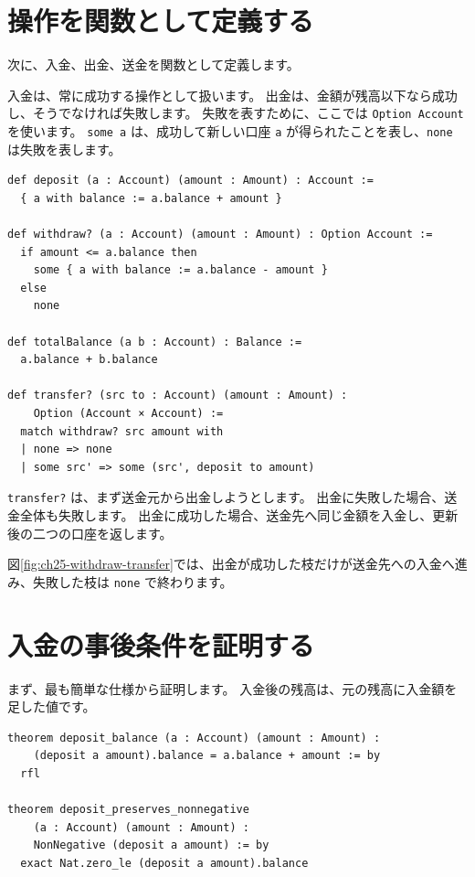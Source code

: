 \section{操作を関数として定義する}

次に、入金、出金、送金を関数として定義します。

入金は、常に成功する操作として扱います。
出金は、金額が残高以下なら成功し、そうでなければ失敗します。
失敗を表すために、ここでは \texttt{Option Account} を使います。
\texttt{some a} は、成功して新しい口座 \texttt{a} が得られたことを表し、\texttt{none} は失敗を表します。

\begin{listing}[htbp]
\begin{verbatim}
def deposit (a : Account) (amount : Amount) : Account :=
  { a with balance := a.balance + amount }

def withdraw? (a : Account) (amount : Amount) : Option Account :=
  if amount <= a.balance then
    some { a with balance := a.balance - amount }
  else
    none

def totalBalance (a b : Account) : Balance :=
  a.balance + b.balance

def transfer? (src to : Account) (amount : Amount) :
    Option (Account × Account) :=
  match withdraw? src amount with
  | none => none
  | some src' => some (src', deposit to amount)
\end{verbatim}
\caption{\texttt{deposit}・\texttt{withdraw?}・\texttt{transfer?}}
\label{lst:ch25-operations}
\end{listing}

\texttt{transfer?} は、まず送金元から出金しようとします。
出金に失敗した場合、送金全体も失敗します。
出金に成功した場合、送金先へ同じ金額を入金し、更新後の二つの口座を返します。

図\ref{fig:ch25-withdraw-transfer}では、出金が成功した枝だけが送金先への入金へ進み、失敗した枝は \texttt{none} で終わります。


\section{入金の事後条件を証明する}

まず、最も簡単な仕様から証明します。
入金後の残高は、元の残高に入金額を足した値です。

\begin{listing}[htbp]
\begin{verbatim}
theorem deposit_balance (a : Account) (amount : Amount) :
    (deposit a amount).balance = a.balance + amount := by
  rfl

theorem deposit_preserves_nonnegative
    (a : Account) (amount : Amount) :
    NonNegative (deposit a amount) := by
  exact Nat.zero_le (deposit a amount).balance
\end{verbatim}
\caption{\texttt{deposit\_balance}}
\label{lst:ch25-deposit-proof}
\end{listing}


